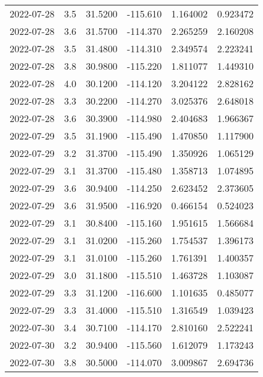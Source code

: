 \begin{tabular}{lrrrrr}
2022-07-28 &       3.5 &  31.5200 &  -115.610 &         1.164002 &         0.923472 \\
2022-07-28 &       3.6 &  31.5700 &  -114.370 &         2.265259 &         2.160208 \\
2022-07-28 &       3.5 &  31.4800 &  -114.310 &         2.349574 &         2.223241 \\
2022-07-28 &       3.8 &  30.9800 &  -115.220 &         1.811077 &         1.449310 \\
2022-07-28 &       4.0 &  30.1200 &  -114.120 &         3.204122 &         2.828162 \\
2022-07-28 &       3.3 &  30.2200 &  -114.270 &         3.025376 &         2.648018 \\
2022-07-28 &       3.6 &  30.3900 &  -114.980 &         2.404683 &         1.966367 \\
2022-07-29 &       3.5 &  31.1900 &  -115.490 &         1.470850 &         1.117900 \\
2022-07-29 &       3.2 &  31.3700 &  -115.490 &         1.350926 &         1.065129 \\
2022-07-29 &       3.1 &  31.3700 &  -115.480 &         1.358713 &         1.074895 \\
2022-07-29 &       3.6 &  30.9400 &  -114.250 &         2.623452 &         2.373605 \\
2022-07-29 &       3.6 &  31.9500 &  -116.920 &         0.466154 &         0.524023 \\
2022-07-29 &       3.1 &  30.8400 &  -115.160 &         1.951615 &         1.566684 \\
2022-07-29 &       3.1 &  31.0200 &  -115.260 &         1.754537 &         1.396173 \\
2022-07-29 &       3.1 &  31.0100 &  -115.260 &         1.761391 &         1.400357 \\
2022-07-29 &       3.0 &  31.1800 &  -115.510 &         1.463728 &         1.103087 \\
2022-07-29 &       3.3 &  31.1200 &  -116.600 &         1.101635 &         0.485077 \\
2022-07-29 &       3.3 &  31.4000 &  -115.510 &         1.316549 &         1.039423 \\
2022-07-30 &       3.4 &  30.7100 &  -114.170 &         2.810160 &         2.522241 \\
2022-07-30 &       3.2 &  30.9400 &  -115.560 &         1.612079 &         1.173243 \\
2022-07-30 &       3.8 &  30.5000 &  -114.070 &         3.009867 &         2.694736 \\

\end{tabular}
